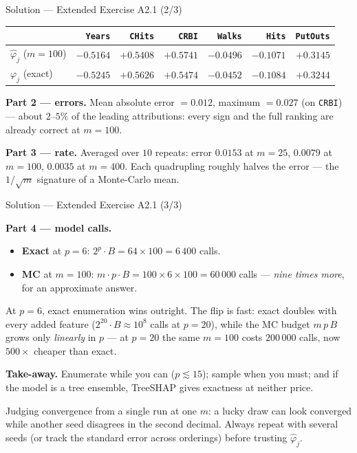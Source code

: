 \documentclass[aspectratio=169,11pt]{beamer}
\begin{document}
\begin{frame}{Solution --- Extended Exercise A2.1 (2/3)}
\begin{solutionbox}[Solution --- the $m{=}100$ run against the exact values]
  \begin{center}
  \begin{tabular}{@{}lrrrrrr@{}}
    \toprule
    & \texttt{Years} & \texttt{CHits} & \texttt{CRBI} & \texttt{Walks} & \texttt{Hits} & \texttt{PutOuts} \\
    \midrule
    $\hat\varphi_j$ ($m{=}100$) & $-0.5164$ & $+0.5408$ & $+0.5741$ & $-0.0496$ & $-0.1071$ & $+0.3145$ \\
    $\varphi_j$ (exact)         & $-0.5245$ & $+0.5626$ & $+0.5474$ & $-0.0452$ & $-0.1084$ & $+0.3244$ \\
    \bottomrule
  \end{tabular}
  \end{center}
  \textbf{Part 2 --- errors.} Mean absolute error $= 0.012$, maximum $= 0.027$
  (on \texttt{CRBI}) --- about $2$--$5\%$ of the leading attributions: every sign
  and the full ranking are already correct at $m=100$.

  \medskip
  \textbf{Part 3 --- rate.} Averaged over $10$ repeats: error $0.0153$ at $m=25$,
  $0.0079$ at $m=100$, $0.0035$ at $m=400$. Each quadrupling roughly halves the
  error --- the $1/\sqrt{m}$ signature of a Monte-Carlo mean.
\end{solutionbox}
\end{frame}

\begin{frame}{Solution --- Extended Exercise A2.1 (3/3)}
\begin{solutionbox}
  \textbf{Part 4 --- model calls.}
  \begin{itemize}
    \item \textbf{Exact} at $p=6$: $2^p \cdot B = 64 \times 100 = 6\,400$ calls.
    \item \textbf{MC} at $m=100$: $m \cdot p \cdot B = 100 \times 6 \times 100
          = 60\,000$ calls --- \emph{nine times more}, for an approximate answer.
  \end{itemize}
  At $p=6$, exact enumeration wins outright. The flip is fast: exact doubles with
  every added feature ($2^{20}\cdot B \approx 10^{8}$ calls at $p=20$), while the
  MC budget $m\,p\,B$ grows only \emph{linearly} in $p$ --- at $p=20$ the same
  $m=100$ costs $200\,000$ calls, now $500\times$ cheaper than exact.

  \smallskip
  \textbf{Take-away.} Enumerate while you can ($p \lesssim 15$); sample when you
  must; and if the model is a tree ensemble, TreeSHAP gives exactness at neither
  price.
\end{solutionbox}
\begin{mistake}
  Judging convergence from a single run at one $m$: a lucky draw can look converged
  while another seed disagrees in the second decimal. Always repeat with several
  seeds (or track the standard error across orderings) before trusting
  $\hat\varphi_j$.
\end{mistake}
\end{frame}
\end{document}
